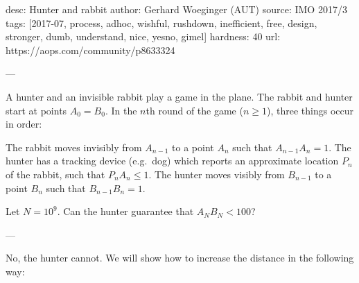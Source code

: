 desc: Hunter and rabbit
author: Gerhard Woeginger (AUT)
source: IMO 2017/3
tags: [2017-07, process, adhoc, wishful, rushdown, inefficient, free, design, stronger, dumb, understand, nice, yesno, gimel]
hardness: 40
url: https://aops.com/community/p8633324

---

A hunter and an invisible rabbit play a game in the plane.
The rabbit and hunter start at points $A_0 = B_0$.
In the $n$th round of the game ($n \ge 1$), three things occur in order:
\begin{enumerate}[(i)]
  \ii The rabbit moves invisibly from $A_{n-1}$ to a point $A_n$
  such that $A_{n-1} A_n = 1$.
  \ii The hunter has a tracking device (e.g.\ dog)
  which reports an approximate location $P_n$ of the rabbit,
  such that $P_n A_n \le 1$.
  \ii The hunter moves visibly from $B_{n-1}$ to a point $B_n$
  such that $B_{n-1} B_n = 1$.
\end{enumerate}
Let $N = 10^9$. Can the hunter guarantee that $A_N B_N < 100$?

---

No, the hunter cannot.
We will show how to increase the distance in the following way:


